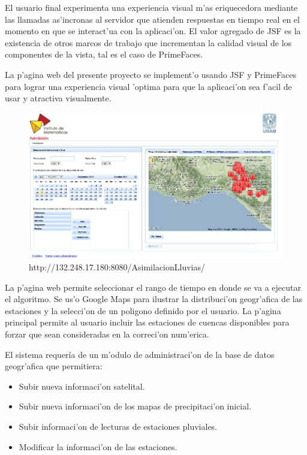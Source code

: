 El usuario final experimenta una experiencia visual m'as eriquecedora mediante las llamadas as'incronas al servidor que atienden
respuestas en tiempo real en el momento en que se interact'ua con la aplicaci'on. El valor agregado de JSF es la existencia de otros
marcos de trabajo que incrementan la calidad visual de los componentes de la vista, tal es el caso de PrimeFaces.

La p'agina web del presente proyecto se implement'o usando JSF y PrimeFaces para lograr una experiencia visual 'optima
para que la aplicaci'on sea f'acil de usar y atractiva visualmente.

\begin{figure}[!ht]
 \centering
 \includegraphics[width=180mm]{./imagenes/pagWeb.jpg}
 \caption{http://132.248.17.180:8080/AsimilacionLluvias/}
\end{figure}


La p'agina web permite seleccionar el rango de tiempo en donde se va a ejecutar el algoritmo. Se us'o Google Maps
para ilustrar la distribuci'on geogr'afica de las estaciones y la selecci'on de un poligono definido por el usuario.
La p'agina principal permite al usuario incluir las estaciones de cuencas disponibles para forzar que 
sean consideradas en la correci'on num'erica. 

El sistema requería de un m'odulo de administraci'on de la base de datos geogr'afica que permitiera:
\begin{itemize}
 \item Subir nueva informaci'on satelital.
  \item Subir nueva informaci'on de los mapas de precipitaci'on inicial.
  \item Subir informaci'on de lecturas de estaciones pluviales.
  \item Modificar la informaci'on de las estaciones.
\end{itemize}

